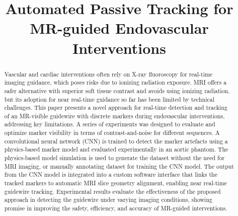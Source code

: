 \documentclass[conference]{IEEEtran}
\begin{document}
\title{Automated Passive Tracking for MR-guided Endovascular Interventions}

\author{
\and
{}
\and
{}
}

\maketitle

\begin{abstract}
Vascular and cardiac interventions often rely on X-ray fluoroscopy for real-time imaging guidance, which poses risks due to ionizing radiation exposure. MRI offers a safer alternative with superior soft tissue contrast and avoids using ionizing radiation, but its adoption for near real-time guidance so far has been limited by technical challenges. This paper presents a novel approach for real-time detection and tracking of an MR-visible guidewire with discrete markers during endovascular interventions, addressing key limitations. A series of experiments was designed to evaluate and
optimize marker visibility in terms of contrast-and-noise for different sequences. A convolutional neural network (CNN) is trained to detect the marker artefacts using a physics-based marker model and evaluated experimentally in an aortic phantom. The physics-based model simulation is used to generate the dataset without the need for MRI imaging, or manually annotating dataset for training the CNN model. The output from the CNN model is integrated into a custom software interface that links the tracked markers to automatic MRI slice geometry alignment, enabling near real-time guidewire tracking. Experimental results evaluate the effectiveness of the proposed approach in detecting the guidewire under varying imaging conditions, showing promise in improving the safety, efficiency, and accuracy of MR-guided interventions.
\end{abstract}
\end{document}
